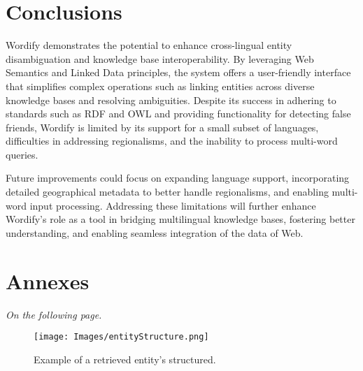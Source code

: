 \documentclass[twocolumn,twoside,11pt,a4paper]{article}
\begin{document}
\section{Conclusions}\label{sec:conclusions}

Wordify demonstrates the potential to enhance cross-lingual entity disambiguation and knowledge base interoperability. By leveraging Web Semantics and Linked Data principles, the system offers a user-friendly interface that simplifies complex operations such as linking entities across diverse knowledge bases and resolving ambiguities. Despite its success in adhering to standards such as RDF and OWL and providing functionality for detecting false friends, Wordify is limited by its support for a small subset of languages, difficulties in addressing regionalisms, and the inability to process multi-word queries.

Future improvements could focus on expanding language support, incorporating detailed geographical metadata to better handle regionalisms, and enabling multi-word input processing. Addressing these limitations will further enhance Wordify's role as a tool in bridging multilingual knowledge bases, fostering better understanding, and enabling seamless integration of the data of Web.






\section{Annexes} \label{sec:annexes}

\textit{On the following page.}

\begin{figure*}
  \begin{center}
    \leavevmode
    \texttt{[image: Images/entityStructure.png]}
    \caption{Example of a retrieved entity's structured.}
    \label{fig:retrieval}
  \end{center}
\end{figure*}
\end{document}
